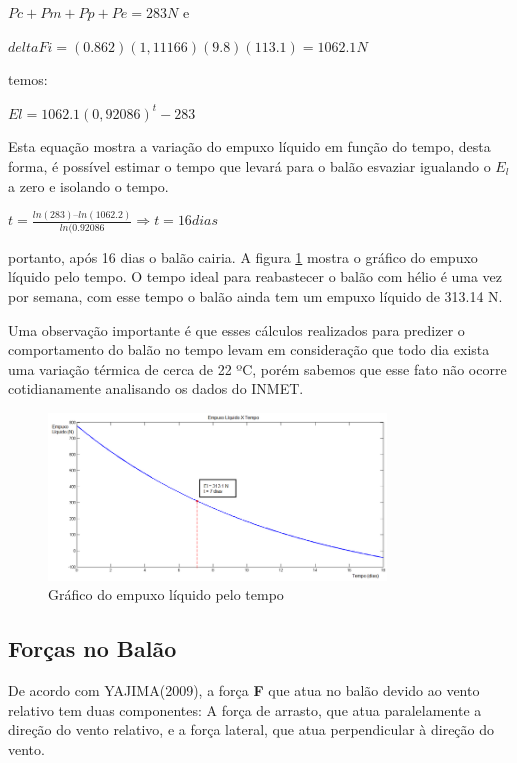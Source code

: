 	 $Pc + Pm + Pp+Pe = 283 N$   e

	 $deltaFi = (0.862)(1,11166)(9.8)(113.1) = 1062.1 N$

	temos:

	 $El = 1062.1(0,92086)^t - 283$

	Esta equação mostra a variação do empuxo líquido em função do tempo, desta forma, é possível estimar o tempo que levará para o balão esvaziar igualando o $E_l$ a zero e isolando o tempo.

	$t = \frac{ln(283) – ln(1062.2)}{ln(0.92086} \Rightarrow t = 16 dias$

	portanto, após 16 dias o balão cairia. A figura \ref{img:empuxoLiquidoTempo} mostra o gráfico do empuxo líquido pelo tempo. O tempo ideal para reabastecer o balão com hélio é uma vez por semana, com esse tempo o balão ainda tem um empuxo líquido de 313.14 N.

	Uma observação importante é que esses cálculos realizados para predizer o comportamento do balão no tempo levam em consideração que todo dia exista uma variação térmica de cerca de 22 ºC, porém sabemos que esse fato não ocorre cotidianamente analisando os dados do INMET.

	\begin{figure}[H]
		\centering
		\includegraphics[width=0.8\textwidth]{figuras/empuxoLiquidoTempo}
		\caption{Gráfico do empuxo líquido pelo tempo}
		\label{img:empuxoLiquidoTempo}
	\end{figure}

\subsection{Forças no Balão} %
\label{sub:for_as_no_bal_o}

De acordo com YAJIMA(2009), a força \textbf{F} que atua no balão devido ao vento relativo tem duas componentes: A força de arrasto, que atua paralelamente a direção do vento relativo, e a força lateral, que atua perpendicular à direção do vento.

